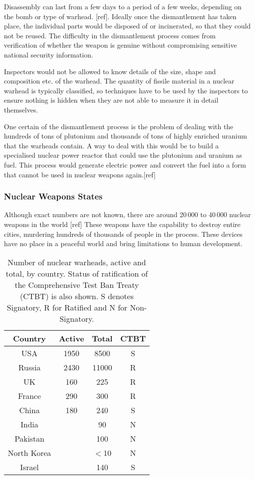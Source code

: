 \documentclass[twocolumn,a4paper]{article}
\begin{document}
Disassembly can last from a few days to a period of a few weeks,
depending on the bomb or type of warhead. [ref]. Ideally once the
dismantlement has taken place, the individual parts would be disposed
of or incinerated, so that they could not be reused. The difficulty in
the dismantlement process comes from verification of whether the
weapon is genuine without compromising sensitive national security
information.

Inspectors would not be allowed to know details of the size, shape and
composition etc. of the warhead. The quantity of fissile material in a
nuclear warhead is typically classified, so techniques have to be used
by the inspectors to ensure nothing is hidden when they are not able
to measure it in detail themselves.

One certain of the dismantlement process is the problem of dealing
with the hundreds of tons of plutonium and thousands of tons of highly
enriched uranium that the warheads contain. A way to deal with this
would be to build a specialised nuclear power reactor that could use
the plutonium and uranium as fuel. This process would generate
electric power and convert the fuel into a form that cannot be used in
nuclear weapons again.[ref]

\subsubsection{Nuclear Weapons States}
Although exact numbers are not known, there are around 20\,000 to
40\,000 nuclear weapons in the world [ref] These weapons have the
capability to destroy entire cities, murdering hundreds of thousands
of people in the process. These devices have no place in a peaceful
world and bring limitations to human development.

\begin{table}
  \begin{tabular}{|c|c|c|c|}
    \hline
    Country	& Active& Total		& CTBT	\\
    \hline
    USA		& 1950 	& 8500		& S	\\
    Russia	& 2430 	& 11000		& R	\\
    UK		& 160 	& 225		& R	\\
    France	& 290	& 300		& R	\\
    China	& 180	& 240		& S	\\
    India	&	& 90		& N	\\
    Pakistan	&	& 100		& N	\\
    North Korea	&	& \(<\)10	& N	\\
    Israel	&	& 140		& S	\\
    \hline
  \end{tabular}
  \caption{Number of nuclear warheads, active and total, by
    country. Status of ratification of the Comprehensive Test Ban
    Treaty (CTBT) is also shown. S denotes Signatory, R for
    Ratified and N for Non-Signatory.}
  \label{tab:NWSwarheadsCTBT}
\end{table}
\end{document}
